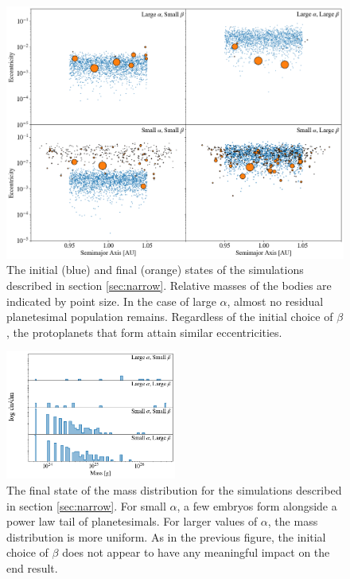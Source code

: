 \documentclass[twocolumn]{aastex63}
\begin{document}

\begin{figure}
\begin{center}
    \includegraphics[width=\textwidth]{figures/alpha_beta.png}
    \caption{The initial (blue) and final (orange) states of the simulations described in section \ref{sec:narrow}. Relative masses of the bodies are indicated by point size. In the case of large $\alpha$, almost no residual planetesimal population remains. Regardless of the initial choice of $\beta$, the protoplanets that form attain similar eccentricities. \label{fig:alpha_beta}}
\end{center}
\end{figure}

\begin{figure}
\begin{center}
    \includegraphics[width=0.5\textwidth]{figures/alpha_beta_mass.png}
    \caption{The final state of the mass distribution for the
      simulations described in section \ref{sec:narrow}. For small
      $\alpha$, a few embryos form alongside a power law tail of
      planetesimals. For larger values of $\alpha$, the mass
      distribution is more uniform.  As in the previous figure, the initial choice of $\beta$ does not appear to have any meaningful impact on the end result.\label{fig:alpha_beta_mass}}
\end{center}
\end{figure}
\end{document}
